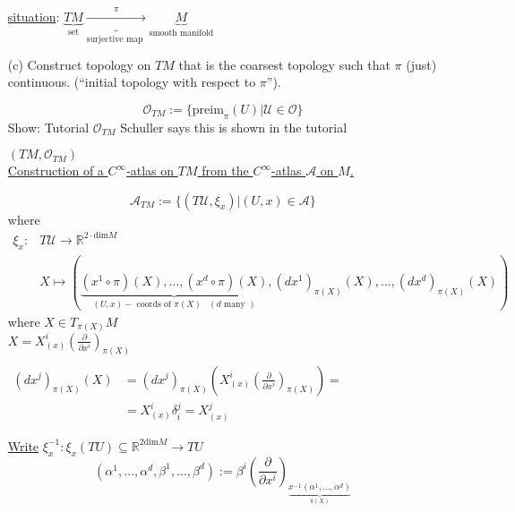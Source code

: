\documentclass[10pt, twoside]{amsart}
\begin{document}
\begin{multicols*}{2}
\begin{enumerate}
\underline{situation}:  $\underbrace{TM}_{\text{set}} \underbrace{ \xrightarrow{ \pi } }_{\text{surjective map }} \underbrace{M}_{\text{smooth manifold}}$

\item[(c)] Construct topology on $TM$ that is the coarsest topology such that $\pi$ (just) continuous.  (``initial topology with respect to $\pi$'').

\[
\mathcal{O}_{TM} := \lbrace \text{preim}_{\pi}(U) | \mathcal{U}\in \mathcal{O} \rbrace
\]
Show: Tutorial $\mathcal{O}_{TM}$
Schuller says this is shown in the tutorial

$(TM,\mathcal{O}_{TM})$  \\

\underline{Construction of a $C^{\infty}$-atlas on $TM$ from the $C^{\infty}$-atlas $\mathcal{A}$ on $M$. }

\[
\mathcal{A}_{TM} := \lbrace (T\mathcal{U},\xi_x  ) | (U,x) \in \mathcal{A} \rbrace
\]
where
\[
\begin{aligned}
  \xi_x : & T \mathcal{U} \to \mathbb{R}^{2\cdot\text{dim}  M } \\
  & X \mapsto (\underbrace{ (x^1 \circ \pi)(X), \dots, (x^d\circ \pi)(X) }_{(U,x)-\text{ coords of $\pi(X)$ } \, (d \text{ many } ) } , (dx^1)_{\pi(X)}(X), \dots , (dx^d)_{\pi(X)}(X)  )
\end{aligned}
\]
where $X\in T_{\pi(X)}M$ \\
\phantom{where } $X = X_{(x)}^i \left( \frac{ \partial }{ \partial x^i} \right)_{\pi(X)}$  \\
\phantom{where } $\begin{aligned} \quad  & \\
  (dx^j)_{\pi(X)}(X) &= (dx^j)_{\pi(X)} \left( X^i_{(x)}\left( \frac{ \partial }{ \partial x^i} \right)_{\pi(X)} \right) = \\
  & = X^i_{(x)}\delta_i^j = X^j_{(x)}\end{aligned}$

\underline{Write} $\xi_x^{-1} : \xi_x(TU) \subseteq \mathbb{R}^{2\text{dim}M} \to TU$
\[
(\alpha^1 , \dots , \alpha^d, \beta^1, \dots , \beta^d) := \beta^i \left( \frac{ \partial }{ \partial x^i} \right)_{ \underbrace{ x^{-1}(\alpha^1 , \dots , \alpha^d) }_{\pi(X)} }
\]


\end{enumerate}
\end{multicols*}
\end{document}

